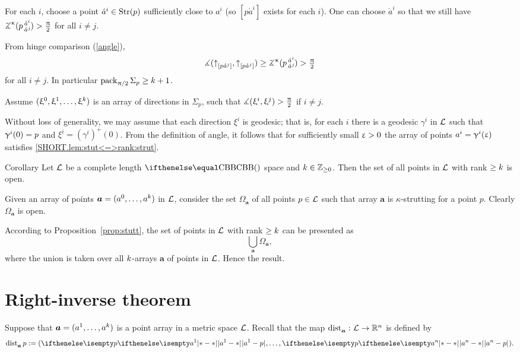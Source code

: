 For each $i$,
choose a point $\acute a^i\in\Str(p)$ sufficiently close to $a^i$ (so $[p\acute a^i]$ exists for each $i$).
One can choose $\acute a^i$ so that we still have
$\angk\kappa{p}{\acute a^i}{\acute a^j}>\tfrac\pi2$ for all $i\ne j$.

From hinge comparison (\ref{angle}),
\[\mangle(\dir{p}{\acute a^j},\dir{p}{\acute a^j})
\ge
\angk\kappa{p}{\acute a^i}{\acute a^j}
>
\tfrac\pi2\]
for all $i\ne j$.
In particular $\pack_{\pi/2}\Sigma_p\ge \kay+1$.

Assume $(\xi^0,\xi^1,\dots,\xi^\kay)$ is an array of directions in $\Sigma_p$, such that $\measuredangle(\upxi^i,\upxi^j)>\tfrac{\uppi}2$ if $i\ne j$.

Without loss of generality, 
we may assume that each direction $\xi^i$ is geodesic;
that is, for each $i$ there is a geodesic $\gamma^i$ in $\mathcal{L}$ such that $\gamma^i(0)\z=p$ and $\xi^i=(\gamma^i)^+(0)$.
From the definition of angle, it follows that for sufficiently small $\upvarepsilon>0$ the array of points $a^i=\upgamma^i(\upvarepsilon)$ satisfies \ref{SHORT.lem:stut<=>rank:strut}.
\qeds

\begin{thm}{Corollary}\label{cor:rank>=k-open}
Let $\mathcal{L}$ be a complete length $\Alex{}$ space and $\kay\in\ZZ_{\ge0}$.
Then the set of all points in $\mathcal{L}$ 
with rank $\ge \kay$ is open.
\end{thm}

 Given an array of points $\bm{a}=(a^0,\dots,a^\kay)$ in $\mathcal{L}$, consider 
the set $\Omega_{\bm{a}}$ of all points $p\in \spc{L}$ such that array $\bm{a}$
 is $\kappa$-strutting for a point $p$.
Clearly $\Omega_{\bm{a}}$ is open.

According to Proposition~\ref{prop:stutt}, the set of points in $\mathcal{L}$ 
with rank $\ge \kay$ can be presented as
\[\bigcup_{\bm{a}}\Omega_{\bm{a}},\]
where the union is taken over all $k$-arrays $\bm{a}$ of points in $\mathcal{L}$.
Hence the result.
\qeds

\section{Right-inverse theorem}\label{sec:right-inverse-1}

Suppose that $\bm{a}=(a^1,\dots,a^\kay)$ is a point array in a metric space $\mathcal{L}$.
Recall that the map $\distfun{\bm{a}}{}{}\:\spc{L}\to\RR^n$ is defined by
\[\distfun{\bm{a}}{p}{}\df(\dist{a^1}{p}{},\dots,\dist{a^n}{p}{}).\] 


